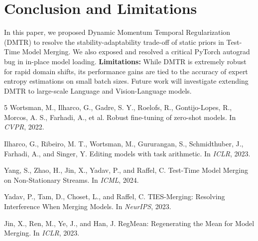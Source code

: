 \documentclass{article}
\begin{document}
\section{Conclusion and Limitations}
In this paper, we proposed Dynamic Momentum Temporal Regularization (DMTR) to resolve the stability-adaptability trade-off of static priors in Test-Time Model Merging. We also exposed and resolved a critical PyTorch autograd bug in in-place model loading. 
\textbf{Limitations:} While DMTR is extremely robust for rapid domain shifts, its performance gains are tied to the accuracy of expert entropy estimations on small batch sizes. Future work will investigate extending DMTR to large-scale Language and Vision-Language models.

\begin{thebibliography}{5}
Wortsman, M., Ilharco, G., Gadre, S. Y., Roelofs, R., Gontijo-Lopes, R., Morcos, A. S., Farhadi, A., et al. Robust fine-tuning of zero-shot models. In \emph{CVPR}, 2022.

Ilharco, G., Ribeiro, M. T., Wortsman, M., Gururangan, S., Schmidthuber, J., Farhadi, A., and Singer, Y. Editing models with task arithmetic. In \emph{ICLR}, 2023.

Yang, S., Zhao, H., Jin, X., Yadav, P., and Raffel, C. Test-Time Model Merging on Non-Stationary Streams. In \emph{ICML}, 2024.

Yadav, P., Tam, D., Choset, L., and Raffel, C. TIES-Merging: Resolving Interference When Merging Models. In \emph{NeurIPS}, 2023.

Jin, X., Ren, M., Ye, J., and Han, J. RegMean: Regenerating the Mean for Model Merging. In \emph{ICLR}, 2023.
\end{thebibliography}
\end{document}
